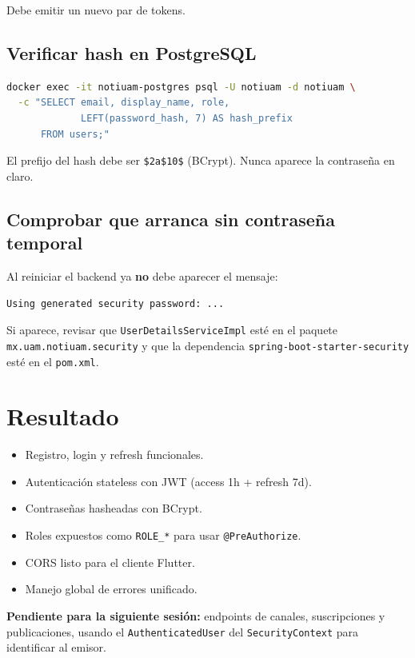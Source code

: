 Debe emitir un nuevo par de tokens.

\subsection{Verificar hash en PostgreSQL}

\begin{lstlisting}[language=bash]
docker exec -it notiuam-postgres psql -U notiuam -d notiuam \
  -c "SELECT email, display_name, role,
             LEFT(password_hash, 7) AS hash_prefix
      FROM users;"
\end{lstlisting}

\begin{exito}
El prefijo del hash debe ser \texttt{\$2a\$10\$} (BCrypt). Nunca aparece la contraseña en claro.
\end{exito}

\subsection{Comprobar que arranca sin contraseña temporal}

Al reiniciar el backend ya \textbf{no} debe aparecer el mensaje:

\begin{lstlisting}[language=bash]
Using generated security password: ...
\end{lstlisting}

Si aparece, revisar que \texttt{UserDetailsServiceImpl} esté en el paquete \texttt{mx.uam.notiuam.security} y que la dependencia \texttt{spring-boot-starter-security} esté en el \texttt{pom.xml}.

\section{Resultado}

\begin{exito}
\begin{itemize}[leftmargin=*]
  \item Registro, login y refresh funcionales.
  \item Autenticación stateless con JWT (access 1h + refresh 7d).
  \item Contraseñas hasheadas con BCrypt.
  \item Roles expuestos como \texttt{ROLE\_*} para usar \texttt{@PreAuthorize}.
  \item CORS listo para el cliente Flutter.
  \item Manejo global de errores unificado.
\end{itemize}
\end{exito}

\textbf{Pendiente para la siguiente sesión:} endpoints de canales, suscripciones y publicaciones, usando el \texttt{AuthenticatedUser} del \texttt{SecurityContext} para identificar al emisor.